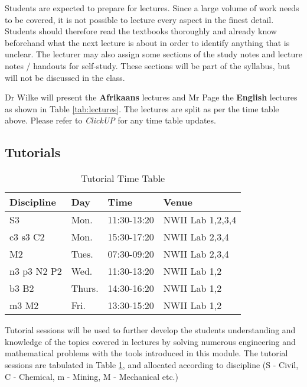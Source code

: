         Students are expected to prepare for lectures. Since a large volume of work
        needs to be covered, it is not possible to lecture every aspect in the
        finest detail. Students should therefore read the textbooks thoroughly
        and already know beforehand what the next lecture is about in order to
        identify anything that is unclear. The lecturer may also assign some
        sections of the study notes and lecture notes / handouts for self-study.
        These sections will be part of the syllabus, but will not be discussed
        in the class.

        Dr Wilke will present the \textbf{Afrikaans} lectures and Mr
        Page the \textbf{English} lectures as shown in
        Table \ref{tab:lectures}. The lectures are split as per the
        time table above. Please refer to {\it ClickUP} for any time table
        updates.

    \subsection{Tutorials}
        \begin{table}[!h]
            \begin{center}
             \begin{tabular}{|l|l|l|l|}
                 \hline
                 {\bf Discipline} & {\bf Day} & {\bf Time} & {\bf Venue} \\
                 \hline
                 S3          & Mon.   & 11:30-13:20 & NWII Lab 1,2,3,4 \\
                 c3 s3 C2    & Mon.   & 15:30-17:20 & NWII Lab 2,3,4 \\
                 M2          & Tues.  & 07:30-09:20 & NWII Lab 2,3,4 \\
                 n3 p3 N2 P2 & Wed.   & 11:30-13:20 & NWII Lab 1,2 \\
                 b3 B2       & Thurs. & 14:30-16:20 & NWII Lab 1,2 \\
                 m3 M2       & Fri.   & 13:30-15:20 & NWII Lab 1,2 \\
                 \hline
             \end{tabular}
             \caption{Tutorial Time Table}
            \label{tab:tutorials}
            \end{center}
        \end{table}

        Tutorial sessions will be used to further develop the students
        understanding and knowledge of the topics covered in lectures
        by solving numerous engineering and mathematical problems with
        the tools introduced in this module. The tutorial sessions are
        tabulated in Table \ref{tab:tutorials}, and allocated
        according to discipline (S - Civil, C - Chemical, m - Mining,
        M - Mechanical etc.)

